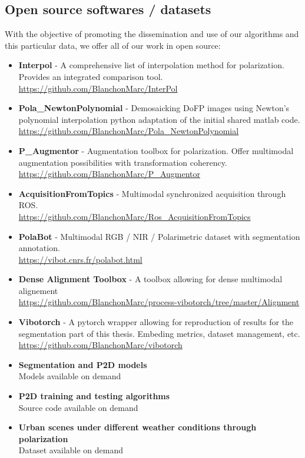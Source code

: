 \subsection{Open source softwares / datasets}
With the objective of promoting the dissemination and use of our algorithms and this particular data, we offer all of our work in open source:

\begin{itemize}
	\item \textbf{Interpol} - A comprehensive list of interpolation method for polarization. Provides an integrated comparison tool.\\
	\url{https://github.com/BlanchonMarc/InterPol}
	\item \textbf{Pola\_NewtonPolynomial} - Demosaicking DoFP images using Newton's polynomial interpolation python adaptation of the initial shared matlab code.\\
	\url{https://github.com/BlanchonMarc/Pola_NewtonPolynomial}
	\item \textbf{P\_Augmentor} - Augmentation toolbox for polarization. Offer multimodal augmentation possibilities with transformation coherency.\\
	\url{https://github.com/BlanchonMarc/P_Augmentor}
	\item \textbf{AcquisitionFromTopics} - Multimodal synchronized acquisition through ROS.\\
	\url{https://github.com/BlanchonMarc/Ros_AcquisitionFromTopics}
	\item \textbf{PolaBot} - Multimodal RGB / NIR / Polarimetric dataset with segmentation annotation.\\
	\url{https://vibot.cnrs.fr/polabot.html}
	\item \textbf{Dense Alignment Toolbox} - A toolbox allowing for dense multimodal alignement \\
	\url{https://github.com/BlanchonMarc/process-vibotorch/tree/master/Alignment}
	\item \textbf{Vibotorch} - A pytorch wrapper allowing for reproduction of results for the segmentation part of this thesis. Embeding metrics, dataset management, etc.\\
	\url{https://github.com/BlanchonMarc/vibotorch}
	\item \textbf{Segmentation and P2D models} \\
	Models available on demand
	\item \textbf{P2D training and testing algorithms} \\
	Source code available on demand
	\item \textbf{Urban scenes under different weather conditions through polarization} \\
	Dataset available on demand
\end{itemize}
